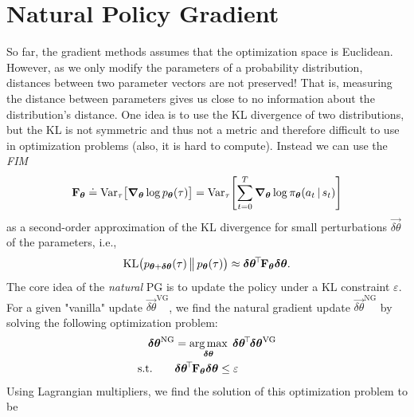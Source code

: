 	\section{Natural Policy Gradient}
		So far, the gradient methods assumes that the optimization space is Euclidean. However, as we only modify the parameters of a probability distribution, distances between two parameter vectors are not preserved! That is, measuring the distance between parameters gives us close to no information about the distribution's distance. One idea is to use the \ac{KL} divergence of two distributions, but the \ac{KL} is not symmetric and thus not a metric and therefore difficult to use in optimization problems (also, it is hard to compute). Instead we can use the \emph{\ac{FIM}}
		\begin{equation}
			\bm{\mathrm{F}}_{\bm{\theta}}
				\doteq \operatorname{Var}_\tau\bigl[ \grad_{\bm{\theta}} \log p_{\bm{\theta}}(\tau) \bigr]
				= \operatorname{Var}_\tau\Biggl[ \sum_{t = 0}^{T} \grad_{\bm{\theta}} \log \pi_{\bm{\theta}}(a_t \,\vert\, s_t) \Biggr]
		\end{equation}
		as a second-order approximation of the \ac{KL} divergence for small perturbations \(\vec{\delta\theta}\) of the parameters, i.e.,
		\begin{equation}
			\operatorname{KL}\bigl( p_{\bm{\theta} + \bm{\delta\theta}}(\tau) \,\big\Vert\, p_{\bm{\theta}}(\tau) \bigr) \approx \bm{\delta\theta}^{\!\top\!} \bm{\mathrm{F}}_{\bm{\theta}} \bm{\delta\theta}.
		\end{equation}
		The core idea of the \emph{natural} \ac{PG} is to update the policy under a \ac{KL} constraint \(\varepsilon\). For a given "vanilla" update \( \vec{\delta\theta}^\mathrm{VG} \), we find the natural gradient update \( \vec{\delta\theta}^\mathrm{NG} \) by solving the following optimization problem:
		\begin{equation}
			\begin{aligned}
				\bm{\delta\theta}^\mathrm{NG} &= \operatorname*{arg\,max}_{\bm{\delta\theta}} \; \bm{\delta\theta}^{\!\top\!} \bm{\delta\theta}^\mathrm{VG} \\
				\text{s.t.}\qquad&
				\begin{aligned}[t]
					\bm{\delta\theta}^{\!\top\!} \bm{\mathrm{F}}_{\bm{\theta}} \bm{\delta\theta} &\leq \varepsilon
				\end{aligned}
			\end{aligned}
			\label{eq:ngOptProblem}
		\end{equation}
		Using Lagrangian multipliers, we find the solution of this optimization problem to be
